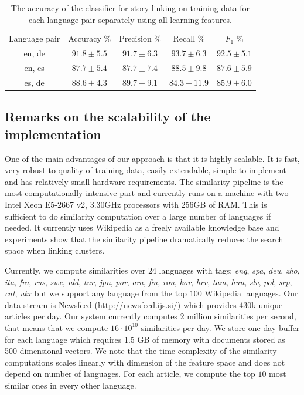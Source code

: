 \begin{table}[h]
\caption{The accuracy of the classifier for story linking on training data for each language pair separately using all learning features.}
\label{table:langPairEval}
\begin{center}
\begin{tabular}{|c|c|c|c|c|}
  \hline
  \cline{1-5}
  Language pair & Accuracy \% & Precision \% & Recall \% & $F_1$ \% \\ \cline{1-5}
  en, de & $91.8 \pm 5.5$ & $91.7 \pm  6.3$ & $93.7 \pm  6.3$ & $92.5 \pm  5.1$ \\ \cline{1-5}
  en, es & $87.7 \pm 5.4$ & $87.7 \pm  7.4$ & $88.5 \pm  9.8$ & $87.6 \pm  5.9$ \\ \cline{1-5}
  es, de & $88.6 \pm 4.3$ & $89.7 \pm  9.1$ & $84.3 \pm 11.9$ & $85.9 \pm  6.0$ \\ \cline{1-5}
  \hline
\end{tabular}
\end{center}
\end{table}

\subsection{Remarks on the scalability of the implementation}

One of the main advantages of our approach is that it is highly scalable. It is fast, very robust to quality of training data, easily extendable, simple to implement and has relatively small hardware requirements. The similarity pipeline is the most computationally intensive part and currently runs on a machine with two Intel Xeon E5-2667 v2, 3.30GHz processors with 256GB of RAM. This is sufficient to do similarity computation over a large number of languages if needed. It currently uses Wikipedia as a freely available knowledge base and experiments show that the similarity pipeline dramatically reduces the search space when linking clusters.

Currently, we compute similarities over $24$ languages with tags: \emph{eng}, \emph{spa}, \emph{deu}, \emph{zho}, \emph{ita}, \emph{fra}, \emph{rus}, \emph{swe}, \emph{nld}, \emph{tur}, \emph{jpn}, \emph{por}, \emph{ara}, \emph{fin}, \emph{ron}, \emph{kor}, \emph{hrv}, \emph{tam}, \emph{hun}, \emph{slv}, \emph{pol}, \emph{srp}, \emph{cat}, \emph{ukr} but we support any language from the top $100$ Wikipedia languages. Our data stream is Newsfeed (http://newsfeed.ijs.si/) which provides 430k unique articles per day. Our system currently computes 2 million similarities per second, that means that we compute $16 \cdot 10^{10}$ similarities per day. We
store one day buffer for each language which requires 1.5 GB of memory with documents   stored as 500-dimensional vectors. We  note that the time complexity of the similarity computations scales linearly with dimension of the feature space and does not  depend on number of languages. For each article, we compute the top $10$  most similar ones in every other language.

